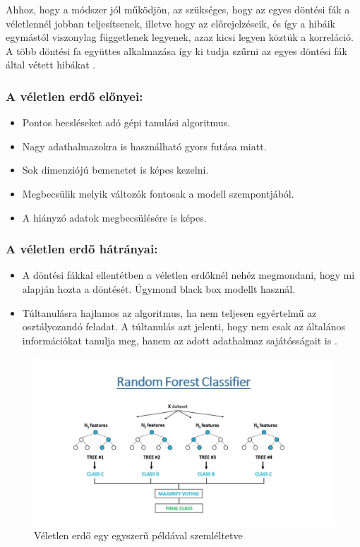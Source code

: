 Ahhoz, hogy a módszer jól működjön, az szükséges, hogy az egyes döntési fák a véletlennél jobban teljesítsenek, illetve hogy az előrejelzéseik, és így a hibáik egymástól viszonylag függetlenek legyenek, azaz kicsi legyen köztük a korreláció. A több döntési fa együttes alkalmazása így ki tudja szűrni az egyes döntési fák által vétett hibákat \cite{veletlen_erdo_1}.

\subsubsection{A véletlen erdő előnyei:}
\begin{itemize}
    \item Pontos becsléseket adó gépi tanulási algoritmus.
    \item Nagy adathalmazokra is használható gyors futása miatt.
    \item Sok dimenziójú bemenetet is képes kezelni.
    \item Megbecsülik melyik változók fontosak a modell szempontjából.
    \item A hiányzó adatok megbecsülésére is képes.
\end{itemize}

\subsubsection{A véletlen erdő hátrányai:}
\begin{itemize}
    \item A döntési fákkal ellentétben a véletlen erdőknél nehéz megmondani, hogy mi alapján hozta a döntését. Úgymond black box modellt használ.
    \item Túltanulásra hajlamos az algoritmus, ha nem teljesen egyértelmű az osztályozandó feladat. A túltanulás azt jelenti, hogy nem csak az általános információkat tanulja meg, hanem az adott adathalmaz sajátósságait is \cite{veletlen_erdo_3}.
\end{itemize}

\begin{figure}[h]
    \centering
    \includegraphics[width=\linewidth]{images/3.fejezet/RandomForest.jpg}
    \caption{Véletlen erdő egy egyszerű példával szemléltetve \cite{veletlenerdo_abra}}
    \label{fig:veletlenerdo}
\end{figure}



